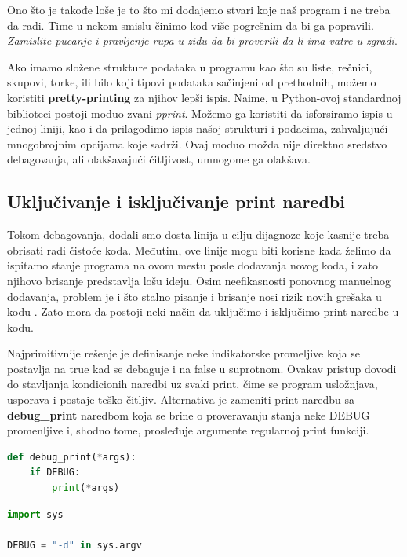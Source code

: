 \documentclass[a4paper]{article}
\begin{document}
Ono što je takođe loše je to što mi dodajemo stvari koje naš program i ne treba da radi. Time u nekom smislu činimo kod više pogrešnim da bi ga popravili. \emph{Zamislite pucanje i pravljenje rupa u zidu da bi proverili da li ima vatre u zgradi}\cite{proPyDeb}.

Ako imamo složene strukture podataka u programu kao što su liste, rečnici, skupovi, torke, ili bilo koji tipovi podataka sačinjeni od prethodnih, možemo koristiti \textbf{pretty-printing} za njihov lepši ispis. Naime, u Python-ovoj standardnoj biblioteci postoji moduo zvani \emph{pprint}\cite{ppDocPyt}. Možemo ga koristiti da isforsiramo ispis u jednoj liniji, kao i da prilagodimo ispis našoj strukturi i podacima, zahvaljujući mnogobrojnim opcijama koje sadrži. Ovaj moduo možda nije direktno sredstvo debagovanja, ali olakšavajući čitljivost, umnogome ga olakšava. 
\subsection{Uključivanje i isključivanje print naredbi}
Tokom debagovanja, dodali smo dosta linija u cilju dijagnoze koje kasnije treba obrisati radi čistoće koda. Međutim, ove linije mogu biti korisne kada želimo da ispitamo stanje programa na ovom mestu posle dodavanja novog koda, i zato njihovo brisanje predstavlja lošu ideju. Osim neefikasnosti ponovnog manuelnog dodavanja, problem je i što stalno pisanje i brisanje nosi rizik novih grešaka u kodu \cite{proPyDeb}. Zato mora da postoji neki način da uključimo i isključimo print naredbe u kodu. 

Najprimitivnije rešenje je definisanje neke indikatorske promeljive koja se postavlja na true kad se debaguje i na false u suprotnom. Ovakav pristup dovodi do stavljanja kondicionih naredbi uz svaki print, čime se program usložnjava, usporava i postaje teško čitljiv. 
Alternativa je zameniti print naredbu sa  \textbf{debug\_print} naredbom koja se brine o proveravanju stanja neke DEBUG promenljive i, shodno tome, prosleđuje argumente regularnoj print funkciji. 
\begin{lstlisting}[language = python, caption = {Definisanje nove print funkcije}]
def debug_print(*args):
    if DEBUG:
        print(*args)
\end{lstlisting}
\begin{lstlisting}[language = python, caption = {Deklarisanje DEBUG promenljive}]
import sys

DEBUG = "-d" in sys.argv
\end{lstlisting}
\end{document}
